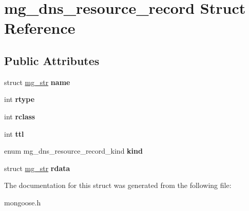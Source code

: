 \hypertarget{structmg__dns__resource__record}{}\section{mg\+\_\+dns\+\_\+resource\+\_\+record Struct Reference}
\label{structmg__dns__resource__record}
\subsection*{Public Attributes}
\begin{DoxyCompactItemize}
\item 
\mbox{\label{structmg__dns__resource__record_afd27e187a02127a98a04757013aecd48}} 
struct \hyperlink{structmg__str}{mg\+\_\+str} {\bfseries name}
\item 
\mbox{\label{structmg__dns__resource__record_a9d314632522fcca513858285c639bee9}} 
int {\bfseries rtype}
\item 
\mbox{\label{structmg__dns__resource__record_a9be7dc2d7ef4e2dc20413289a55f6ff7}} 
int {\bfseries rclass}
\item 
\mbox{\label{structmg__dns__resource__record_aa5d1c1a7ba2d02908c27fab68ded25be}} 
int {\bfseries ttl}
\item 
\mbox{\label{structmg__dns__resource__record_a6f9d5dda9d8ae9240a74282c44d4a555}} 
enum mg\+\_\+dns\+\_\+resource\+\_\+record\+\_\+kind {\bfseries kind}
\item 
\mbox{\label{structmg__dns__resource__record_ac169801d0c9ce94137fcce9a3f629152}} 
struct \hyperlink{structmg__str}{mg\+\_\+str} {\bfseries rdata}
\end{DoxyCompactItemize}


The documentation for this struct was generated from the following file\+:\begin{DoxyCompactItemize}
\item 
mongoose.\+h\end{DoxyCompactItemize}
